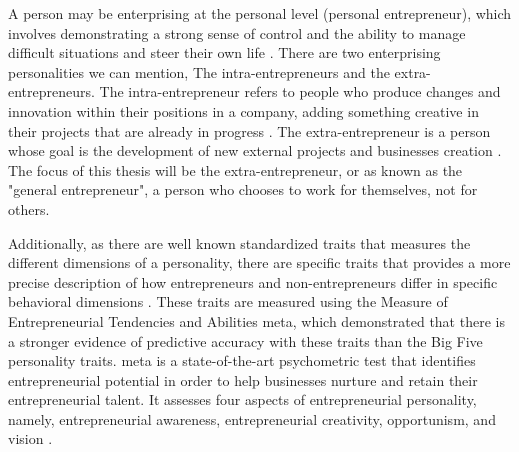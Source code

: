 A person may be enterprising at the personal level (personal entrepreneur), which involves demonstrating a strong sense of control and the ability to manage difficult situations and steer their own life \cite{frese20014}. There are two enterprising personalities we can mention, The intra-entrepreneurs and the extra-entrepreneurs. The intra-entrepreneur refers to people who produce changes and innovation within their positions in a company, adding something creative in their projects that are already in progress \cite{mumford2020intrapreneurship}. The extra-entrepreneur is a person whose goal is the development of new external projects and businesses creation \cite{postigo2021general}. The focus of this thesis will be the extra-entrepreneur, or as known as the "general entrepreneur", a person who chooses to work for themselves, not for others.

Additionally, as there are well known standardized traits that measures the different dimensions of a personality, there are specific traits that provides a more precise description of how entrepreneurs and non-entrepreneurs differ in specific behavioral dimensions \cite{postigo2021general}. These traits are measured using the Measure of Entrepreneurial Tendencies and Abilities \ac{meta}, which demonstrated that there is a stronger evidence of predictive accuracy with these traits than the Big Five personality traits. \ac{meta} is a state-of-the-art psychometric test that identifies entrepreneurial potential in order to help businesses nurture and retain their entrepreneurial talent. It assesses four aspects of entrepreneurial personality, namely, entrepreneurial awareness, entrepreneurial creativity, opportunism, and vision  \cite{ahmetoglu2011eq}.

